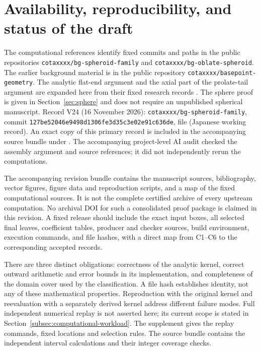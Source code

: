 \section{Availability, reproducibility, and status of the draft}
\label{sec:availability}

The computational references identify fixed commits and paths in
the public repositories \texttt{cotaxxxx/bg-spheroid-family} and
\texttt{cotaxxxx/bg-oblate-spheroid}.
The earlier background material is in the public repository
\texttt{cotaxxxx/basepoint-geometry}.  The analytic flat-end
argument and the axial part of the prolate-tail argument are
expanded here from their fixed research records
\citep{data-oblate-analytic,data-prolate-axis}.
The sphere proof is given in Section~\ref{sec:sphere} and does
not require an unpublished spherical manuscript.
Record V24 (16 November 2026): \texttt{cotaxxxx/bg-spheroid-family},
commit \texttt{127be52046e9498d1306fe3d35c3e02e91c636de},
file \href{https://github.com/cotaxxxx/bg-spheroid-family/blob/127be52046e9498d1306fe3d35c3e02e91c636de/runs/2026-11-16/D_OB_GLOBAL_CLOSED_V24/JUDGE_RULING_D_OB_GLOBAL_CLOSED_20261116.md}{}
(Japanese working record). An exact copy of this primary record is
included in the accompanying source bundle under .
The accompanying project-level AI audit checked the assembly argument
and source references; it did not independently rerun the computations.

The accompanying revision bundle contains the manuscript sources,
bibliography, vector figures, figure data and reproduction scripts,
and a map of the fixed computational sources.  It is not the
complete certified archive of every upstream computation.  No
archival DOI for such a consolidated proof package is claimed
in this revision.  A fixed release should include the exact
input boxes, all selected final leaves, coefficient tables,
producer and checker sources, build environment, execution
commands, and file hashes, with a direct map from C1--C6 to
the corresponding accepted records.

There are three distinct obligations: correctness of the analytic
kernel, correct outward arithmetic and error bounds in its
implementation, and completeness of the domain cover used by
the classification.  A file hash establishes identity, not any
of these mathematical properties.  Reproduction with the original
kernel and reevaluation with a separately derived kernel address
different failure modes.  Full independent numerical replay is
not asserted here; its current scope is stated in
Section~\ref{subsec:computational-workload}.
The supplement gives the replay commands, fixed locations and selection rules. The source bundle contains the independent interval calculations and their integer coverage checks.

